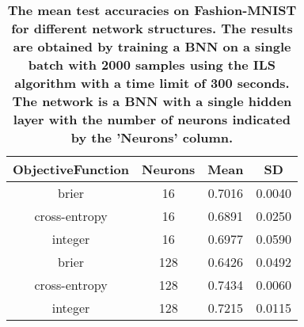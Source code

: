 \begin{center}
\begin{table}[!b]
\centering
\begin{tabular}{|c|c|c|c|}
  \hline
ObjectiveFunction & Neurons & Mean & SD \\ 
  \hline
brier & 16 & 0.7016 & 0.0040 \\ 
   \hline
cross-entropy & 16 & 0.6891 & 0.0250 \\ 
   \hline
integer & 16 & 0.6977 & 0.0590 \\ 
   \hline
brier & 128 & 0.6426 & 0.0492 \\ 
   \hline
cross-entropy & 128 & 0.7434 & 0.0060 \\ 
   \hline
integer & 128 & 0.7215 & 0.0115 \\ 
   \hline
\end{tabular}
\caption{\small{\textbf{The mean test accuracies on Fashion-MNIST for different network structures. The results are obtained by training a BNN
            on a single batch with 2000 samples using the ILS algorithm with a time limit of 300 seconds.
            The network is a BNN with a single hidden layer with the number of neurons indicated by the 'Neurons' column.}}} 
\label{SBT_DNS_FMNIST}
\end{table}

\end{center}
